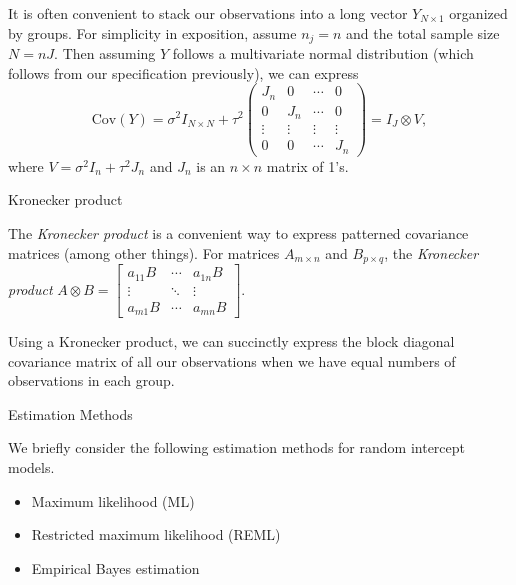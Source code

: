 \documentclass[ignorenonframetext,]{beamer}
\begin{document}
\begin{frame}{}

It is often convenient to stack our observations into a long vector
\(Y_{N \times 1}\) organized by groups. For simplicity in exposition,
assume \(n_j=n\) and the total sample size \(N=nJ\). Then assuming \(Y\)
follows a multivariate normal distribution (which follows from our
specification previously), we can express
\[\text{Cov}(Y)=\sigma^2I_{N\times N} + \tau^2 \begin{pmatrix} J_n & 0 & \cdots & 0 \\ 0 & J_n & \cdots & 0 \\
\vdots & \vdots & \vdots & \vdots \\ 0 & 0 & \cdots & J_n \end{pmatrix}=I_J \otimes V,\]
where \(V=\sigma^2I_n+\tau^2J_n\) and \(J_n\) is an \(n \times n\)
matrix of 1's.

\end{frame}

\begin{frame}{Kronecker product}

The \emph{Kronecker product} is a convenient way to express patterned
covariance matrices (among other things). For matrices
\(A_{m \times n}\) and \(B_{p \times q}\), the \emph{Kronecker product}
\(A \otimes B=\begin{bmatrix}a_{11}B & \cdots & a_{1n}B \\ \vdots & \ddots & \vdots \\ a_{m1}B & \cdots & a_{mn}B \end{bmatrix}\).

Using a Kronecker product, we can succinctly express the block diagonal
covariance matrix of all our observations when we have equal numbers of
observations in each group.

\end{frame}

\begin{frame}{Estimation Methods}

We briefly consider the following estimation methods for random
intercept models.

\begin{itemize}
\item
  Maximum likelihood (ML)
\item
  Restricted maximum likelihood (REML)
\item
  Empirical Bayes estimation
\end{itemize}

\end{frame}
\end{document}

